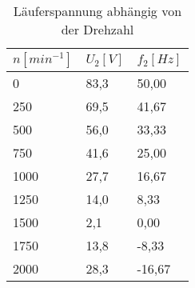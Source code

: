 \begin{table}[htbp]
  \centering
  \begin{tabularx}{\columnwidth}{XXX}
    \toprule
    $n[min^{-1}]$ & $U_2[V]$ & $f_2[Hz]$ \\
    \midrule
    0             & 83,3     & 50,00     \\
    250           & 69,5     & 41,67     \\
    500           & 56,0     & 33,33     \\
    750           & 41,6     & 25,00     \\
    1000          & 27,7     & 16,67     \\
    1250          & 14,0     & 8,33      \\
    1500          & 2,1      & 0,00      \\
    1750          & 13,8     & -8,33     \\
    2000          & 28,3     & -16,67    \\
    \bottomrule
  \end{tabularx}
  \caption{Läuferspannung abhängig von der Drehzahl}
\end{table}
